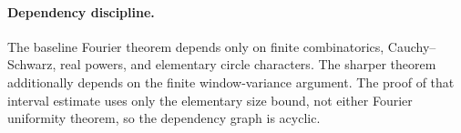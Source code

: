 \paragraph{Dependency discipline.}
The baseline Fourier theorem depends only on finite combinatorics,
Cauchy--Schwarz, real powers, and elementary circle characters.
The sharper theorem additionally depends on the finite
window-variance argument.  The proof of that interval estimate
uses only the elementary size bound, not either Fourier
uniformity theorem, so the dependency graph is acyclic.
